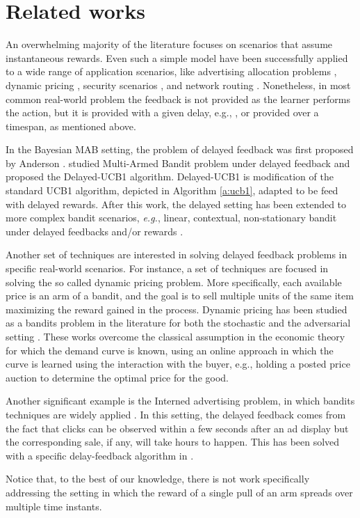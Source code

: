 \section{Related works}
An overwhelming majority of the literature focuses on scenarios that assume instantaneous rewards.
Even such a simple model have been successfully applied to a wide range of application scenarios, like advertising allocation problems \cite{gatti2015truthful,nuara2020online,nuara2018combinatorial}, dynamic pricing \cite{trovo2018improving,trovo2020sliding}, security scenarios \cite{bisi2017regret}, and network routing \cite{li2016contextual}.
Nonetheless, in most common real-world problem the feedback is not provided as the learner performs the action, but it is provided with a given delay, e.g., \cite{nuara2019dealing}, or provided over a timespan, as mentioned above.


In the Bayesian MAB setting, the problem of delayed feedback was first proposed by Anderson \cite{anderson1964sequential}. \cite{joulani2013} studied Multi-Armed Bandit problem under delayed feedback and proposed the Delayed-UCB1 algorithm. Delayed-UCB1 is modification of the standard UCB1 algorithm, depicted in Algorithm \ref{a:ucb1}, adapted to be feed with delayed rewards. After this work, the delayed setting has been extended to more complex bandit scenarios, \emph{e.g.}, linear, contextual, non-stationary bandit under delayed feedbacks and/or rewards \citep{vernade2020non, vernade2020linear, gael2020stochastic, pike2018bandits}.

Another set of techniques are interested in solving delayed feedback problems in specific real-world scenarios.
For instance, a set of techniques are focused in solving the so called dynamic pricing problem.
More specifically, each available price is an arm of a bandit, and the goal is to sell multiple units of the same item maximizing the reward gained in the process.
Dynamic pricing has been studied as a bandits problem in the literature for both the stochastic \cite{babaioff2015dynamic} and the adversarial setting \cite{amin2013learning}.
These works overcome the classical assumption in the economic theory for which the demand curve is known, using an online approach in which the curve is learned using the interaction with the buyer, e.g., holding a posted price auction \citep{babaioff2017posting,romano2020online} to determine the optimal price for the good.

Another significant example is the Interned advertising problem, in which bandits techniques are widely applied \citep{badanidiyuru2013bandits, nuara2018combinatorial, avadhanula2021stochastic}. In this setting, the delayed feedback comes from the fact that clicks can be observed within a few seconds after an ad display but the corresponding sale, if any, will take hours to happen.
This has been solved with a specific delay-feedback algorithm in \citet{vernade2017stochastic}.

Notice that, to the best of our knowledge, there is not work specifically addressing the setting in which the reward of a single pull of an arm spreads over multiple time instants.
